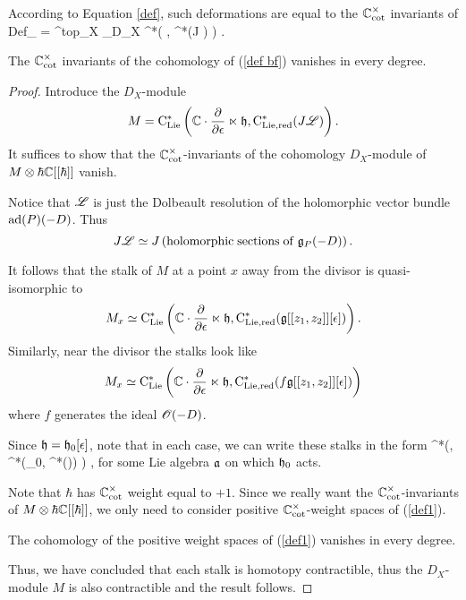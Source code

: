 \documentclass[11pt]{amsart}
\begin{document}
According to Equation \ref{def}, such deformations are equal to the $\mathbb C^\times_{\rm cot}$ invariants of
\beqn\label{def bf}
{\rm Def}_{\sL} = \Omega^{top}_X \tensor_{D_X} \clie^*\left(\CC \cdot \frac{\partial}{\partial \epsilon} \ltimes \fh, \cred^*(J \sL) \right) .
\eeqn

\begin{lem}
The $\mathbb C^\times_{\rm cot}$ invariants of the cohomology of (\ref{def bf}) vanishes in every degree. 
\end{lem}
\begin{proof}
Introduce the $D_X$-module
\[
M = {\rm C}_{{\rm Lie}}^*\left(\mathbb C \cdot \frac{\partial}{\partial \epsilon} \ltimes \mathfrak h, {\rm C}_{\rm Lie, red}^*(J \mathscr L) \right). 
\]
It suffices to show that the $\mathbb C^{\times}_{\rm cot}$-invariants of the cohomology $D_X$-module of $M \otimes \hbar \mathbb C[[\hbar]]$ vanish. 

Notice that $\mathscr L$ is just the Dolbeault resolution of the holomorphic vector bundle ${\rm ad}(P)(-D)$. 
Thus
\[
J \mathscr L \simeq J\left({\rm holomorphic\;sections\;of\;}\mathfrak g_P(-D)\right) .
\]

It follows that the stalk of $M$ at a point $x$ away from the divisor is quasi-isomorphic to
\[
M_x \simeq {\rm C}_{{\rm Lie}}^*\left(\mathbb C \cdot \frac{\partial}{\partial \epsilon} \ltimes \mathfrak h, {\rm C}_{\rm Lie, red}^*(\mathfrak g[[z_1,z_2]][\epsilon]) \right) .
\]
Similarly, near the divisor the stalks look like
\[
M_x \simeq {\rm C}_{{\rm Lie}}^*\left(\mathbb C \cdot \frac{\partial}{\partial \epsilon} \ltimes \mathfrak h, {\rm C}_{\rm Lie, red}^*(f\mathfrak g[[z_1,z_2]][\epsilon]) \right)
\]
where $f$ generates the ideal $\mathscr O(-D)$. 

Since $\mathfrak h = \mathfrak h_0[\epsilon]$, note that in each case, we can write these stalks in the form
\beqn\label{def1}
 \clie^*\left(\CC \cdot \frac{\partial}{\partial \epsilon}, \clie^*(\fh_0, \cred^*(\fa [\epsilon])) \right) ,
\eeqn
for some Lie algebra $\mathfrak a$ on which $\mathfrak h_0$ acts. 

Note that $\hbar$ has $\mathbb C^\times_{\rm cot}$ weight equal to $+1$. 
Since we really want the $\mathbb C^\times_{\rm cot}$-invariants of $M \otimes \hbar \mathbb C[[\hbar]]$, we only need to consider positive $\mathbb C^\times_{\rm cot}$-weight spaces of (\ref{def1}). 

\begin{lem}
The cohomology of the positive weight spaces of (\ref{def1}) vanishes in every degree. 
\end{lem} 

Thus, we have concluded that each stalk is homotopy contractible, thus the $D_X$-module $M$ is also contractible and the result follows. 
\end{proof}
\end{document}
